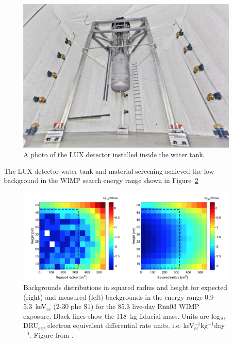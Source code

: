 \begin{figure}[htbp]
\begin{center}
\includegraphics[width=\textwidth]{figures/lux/lux_watertank.png}
\caption{A photo of the LUX detector installed inside the water tank.}
\label{fig:luxwatertank}
\end{center}
\end{figure}

The \ac{LUX} detector water tank and material screening achieved the low background in the \ac{WIMP} search energy range shown in Figure~\ref{fig:luxrun03bkg}

\begin{figure}[htbp]
\begin{center}
\includegraphics[width=\textwidth]{figures/lux/lux_run03bkg.png}
\caption{Backgrounds distributions in squared radius and height for expected (right) and measured (left) backgrounds in the energy range 0.9-5.3~keV$_{ee}$ (2-30 phe S1) for the 85.3 live-day Run03 \ac{WIMP} exposure. Black lines show the 118~kg fiducial mass. Units are log$_{10}$DRU$_{ee}$, electron equivalent differential rate units, i.e. keV$_{ee}^{-1}$kg$^{-1}$day$^{-1}$.  Figure from \cite{LUXRun03Backgrounds}. }
\label{fig:luxrun03bkg}
\end{center}
\end{figure}


